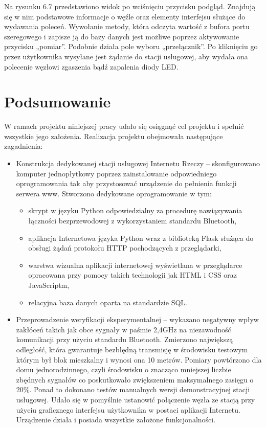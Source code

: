 \documentclass[12pt, twoside, openany]{mwrep}
\begin{document}
\par
Na rysunku 6.7 przedstawiono widok po wciśnięciu przycisku podgląd. Znajdują się w nim podstawowe informacje o węźle oraz elementy interfejsu służące do wydawania poleceń. Wywołanie metody, która odczyta wartość z bufora portu szeregowego i zapisze ją do bazy danych jest możliwe poprzez aktywowanie przycisku „pomiar”. Podobnie działa pole wyboru „przełącznik”. Po kliknięciu go przez użytkownika wysyłane jest żądanie do stacji usługowej, aby wydała ona polecenie węzłowi zgaszenia bądź zapalenia diody LED.

\chapter{Podsumowanie}

W ramach projektu niniejszej pracy udało się osiągnąć cel projektu i spełnić wszystkie jego założenia. Realizacja projektu obejmowała następujące zagadnienia:
\begin{itemize}
\item	Konstrukcja dedykowanej stacji usługowej Internetu Rzeczy – skonfigurowano komputer jednopłytkowy poprzez zainstalowanie odpowiedniego oprogramowania tak aby przystosować urządzenie do pełnienia funkcji serwera www. Stworzono dedykowane oprogramowanie w tym:
\begin{itemize}
\item	skrypt w języku Python odpowiedzialny za procedurę nawiązywania łączności bezprzewodowej z wykorzystaniem standardu Bluetooth,
\item	aplikacja Internetowa języka Python wraz z biblioteką Flask służąca do obsługi żądań protokołu HTTP pochodzących z przeglądarki,
\item	warstwa wizualna aplikacji internetowej wyświetlana w przeglądarce opracowana przy pomocy takich technologii jak HTML i CSS oraz JavaScriptm,  
\item	relacyjna baza danych oparta na standardzie SQL.
\end{itemize}
\item	Przeprowadzenie weryfikacji eksperymentalnej – wykazano negatywny wpływ zakłóceń takich jak obce sygnały w paśmie 2,4GHz na niezawodność komunikacji przy użyciu standardu Bluetooth. Zmierzono największą odległość, która gwarantuje bezbłędną transmisję w środowisku testowym którym był blok mieszkalny i wynosi ona 10 metrów. Pomiary powtórzono dla domu jednorodzinnego, czyli środowisku o znacząco mniejszej liczbie zbędnych sygnałów co poskutkowało zwiększeniem maksymalnego zasięgu o 20\%.
Ponad to dokonano testów manualnych wersji demonstracyjnej stacji usługowej. Udało się w pomyślnie ustanowić połączenie węzła ze stacją przy użyciu graficznego interfejsu użytkownika w postaci aplikacji Internetu. Urządzenie działa i posiada wszystkie założone funkcjonalności.
\end{itemize}
\end{document}
